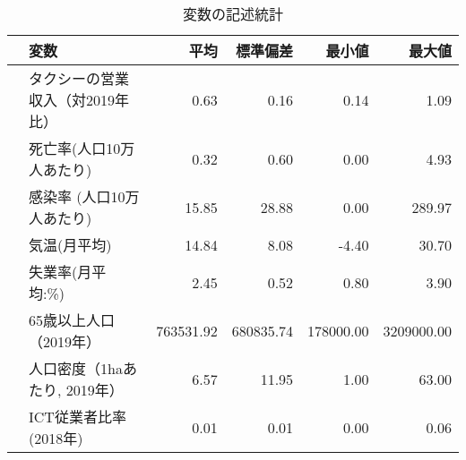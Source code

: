\documentclass[a4paper,landscape]{jsarticle}
\begin{document}
\begin{table}
\centering
\captionsetup{labelformat=empty,labelsep=none}
\caption{変数の記述統計}
\begin{tabular}{rlrrrr}
  \hline
 & 変数 & 平均 & 標準偏差 & 最小値 & 最大値 \\ 
  \hline
 & タクシーの営業収入（対2019年比） & 0.63 & 0.16 & 0.14 & 1.09 \\ 
 & 死亡率(人口10万人あたり) & 0.32 & 0.60 & 0.00 & 4.93 \\ 
 & 感染率 (人口10万人あたり) & 15.85 & 28.88 & 0.00 & 289.97 \\ 
 & 気温(月平均) & 14.84 & 8.08 & -4.40 & 30.70 \\ 
 & 失業率(月平均:\%) & 2.45 & 0.52 & 0.80 & 3.90 \\ 
 & 65歳以上人口（2019年） & 763531.92 & 680835.74 & 178000.00 & 3209000.00 \\ 
 & 人口密度（1haあたり, 2019年） & 6.57 & 11.95 & 1.00 & 63.00 \\ 
  & ICT従業者比率(2018年) & 0.01 & 0.01 & 0.00 & 0.06 \\ 
 \hline
\end{tabular}
\label{tb-ref}
\end{table}
\end{document}
